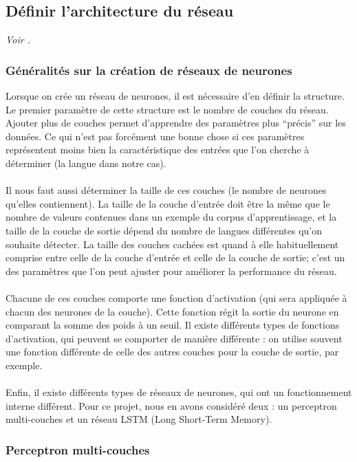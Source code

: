 \documentclass{article}
\begin{document}
\subsection{Définir l'architecture du réseau}

\textit{Voir \cite{lecun2015}.}

\subsubsection{Généralités sur la création de réseaux de neurones}
Lorsque on crée un réseau de neurones, il est nécessaire d'en définir la structure. Le premier paramètre de cette structure est le nombre de couches du réseau. Ajouter plus de couches permet d'apprendre des paramètres plus ``précis'' sur les données. Ce qui n'est pas forcément une bonne chose si ces paramètres représentent moins bien la caractéristique des entrées que l'on cherche à déterminer (la langue dans notre cas).\\
 \\
Il nous faut aussi déterminer la taille de ces couches (le nombre de neurones qu'elles contiennent). La taille de la couche d'entrée doit être la même que le nombre de valeurs contenues dans un exemple du corpus d'apprentissage, et la taille de la couche de sortie dépend du nombre de langues différentes qu'on souhaite détecter. La taille des couches cachées est quand à elle habituellement comprise entre celle de la couche d'entrée et celle de la couche de sortie; c'est un des paramètres que l'on peut ajuster pour améliorer la performance du réseau.\\
 \\
Chacune de ces couches comporte une fonction d'activation (qui sera appliquée à chacun des neurones de la couche). Cette fonction régit la sortie du neurone en comparant la somme des poids à un seuil. Il existe différents types de fonctions d'activation, qui peuvent se comporter de manière différente : on utilise souvent une fonction différente de celle des autres couches pour la couche de sortie, par exemple.\\
 \\
Enfin, il existe différents types de réseaux de neurones, qui ont un fonctionnement interne différent.  Pour ce projet, nous en avons considéré deux : un perceptron multi-couches et un réseau LSTM (Long Short-Term Memory).
 
\subsubsection{Perceptron multi-couches}
\end{document}
